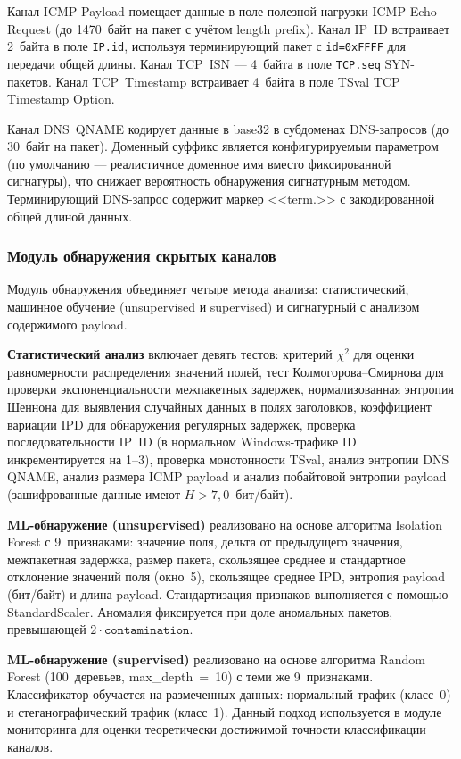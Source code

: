 Канал ICMP Payload помещает данные в поле полезной нагрузки ICMP Echo Request (до 1470~байт на пакет с учётом length prefix). Канал IP~ID встраивает 2~байта в поле \texttt{IP.id}, используя терминирующий пакет с \texttt{id=0xFFFF} для передачи общей длины. Канал TCP~ISN --- 4~байта в поле \texttt{TCP.seq} SYN-пакетов. Канал TCP~Timestamp встраивает 4~байта в поле TSval TCP Timestamp Option.

Канал DNS~QNAME кодирует данные в base32 в субдоменах DNS-запросов (до 30~байт на пакет). Доменный суффикс является конфигурируемым параметром (по умолчанию --- реалистичное доменное имя вместо фиксированной сигнатуры), что снижает вероятность обнаружения сигнатурным методом. Терминирующий DNS-запрос содержит маркер <<term.>> с закодированной общей длиной данных.

\subsubsection{Модуль обнаружения скрытых каналов}

Модуль обнаружения объединяет четыре метода анализа: статистический, машинное обучение (unsupervised и supervised) и сигнатурный с анализом содержимого payload.

\textbf{Статистический анализ} включает девять тестов: критерий $\chi^2$ для оценки равномерности распределения значений полей, тест Колмогорова--Смирнова для проверки экспоненциальности межпакетных задержек, нормализованная энтропия Шеннона для выявления случайных данных в полях заголовков, коэффициент вариации IPD для обнаружения регулярных задержек, проверка последовательности IP~ID (в нормальном Windows-трафике ID инкрементируется на 1--3), проверка монотонности TSval, анализ энтропии DNS QNAME, анализ размера ICMP payload и анализ побайтовой энтропии payload (зашифрованные данные имеют $H > 7{,}0$~бит/байт).

\textbf{ML-обнаружение (unsupervised)} реализовано на основе алгоритма Isolation Forest с 9~признаками: значение поля, дельта от предыдущего значения, межпакетная задержка, размер пакета, скользящее среднее и стандартное отклонение значений поля (окно~5), скользящее среднее IPD, энтропия payload (бит/байт) и длина payload. Стандартизация признаков выполняется с помощью StandardScaler. Аномалия фиксируется при доле аномальных пакетов, превышающей $2 \cdot \texttt{contamination}$.

\textbf{ML-обнаружение (supervised)} реализовано на основе алгоритма Random Forest (100~деревьев, max\_depth~=~10) с теми же 9~признаками. Классификатор обучается на размеченных данных: нормальный трафик (класс~0) и стеганографический трафик (класс~1). Данный подход используется в модуле мониторинга для оценки теоретически достижимой точности классификации каналов.

